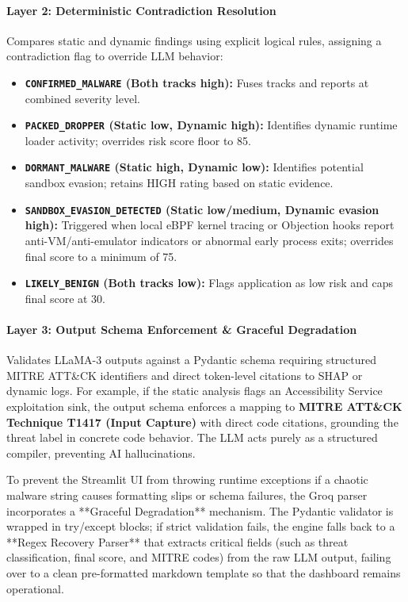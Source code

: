 \documentclass[10pt,a4paper]{article}
\begin{document}
\paragraph{Layer 2: Deterministic Contradiction Resolution}
Compares static and dynamic findings using explicit logical rules, assigning a contradiction flag to override LLM behavior:
\begin{itemize}
  \item \textbf{\texttt{CONFIRMED\_MALWARE} (Both tracks high):} Fuses tracks and reports at combined severity level.
  \item \textbf{\texttt{PACKED\_DROPPER} (Static low, Dynamic high):} Identifies dynamic runtime loader activity; overrides risk score floor to 85.
  \item \textbf{\texttt{DORMANT\_MALWARE} (Static high, Dynamic low):} Identifies potential sandbox evasion; retains HIGH rating based on static evidence.
  \item \textbf{\texttt{SANDBOX\_EVASION\_DETECTED} (Static low/medium, Dynamic evasion high):} Triggered when local eBPF kernel tracing or Objection hooks report anti-VM/anti-emulator indicators or abnormal early process exits; overrides final score to a minimum of 75.
  \item \textbf{\texttt{LIKELY\_BENIGN} (Both tracks low):} Flags application as low risk and caps final score at 30.
\end{itemize}

\paragraph{Layer 3: Output Schema Enforcement \& Graceful Degradation}
Validates LLaMA-3 outputs against a Pydantic schema requiring structured MITRE ATT\&CK identifiers and direct token-level citations to SHAP or dynamic logs. For example, if the static analysis flags an Accessibility Service exploitation sink, the output schema enforces a mapping to \textbf{MITRE ATT\&CK Technique T1417 (Input Capture)} with direct code citations, grounding the threat label in concrete code behavior. The LLM acts purely as a structured compiler, preventing AI hallucinations.

To prevent the Streamlit UI from throwing runtime exceptions if a chaotic malware string causes formatting slips or schema failures, the Groq parser incorporates a **Graceful Degradation** mechanism. The Pydantic validator is wrapped in try/except blocks; if strict validation fails, the engine falls back to a **Regex Recovery Parser** that extracts critical fields (such as threat classification, final score, and MITRE codes) from the raw LLM output, failing over to a clean pre-formatted markdown template so that the dashboard remains operational.
\end{document}
